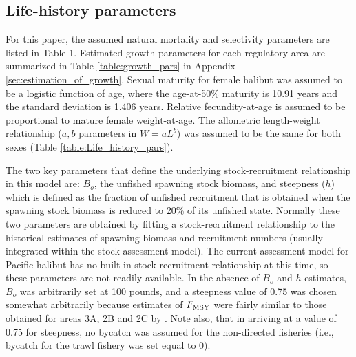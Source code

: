 \subsection*{Life-history parameters}%
\label{sub:life_history_parameters_and_price_information}
For this paper, the assumed natural mortality  and selectivity parameters are listed in Table 1.  Estimated growth parameters for each regulatory area are summarized in Table \ref{table:growth_pars} in Appendix \ref{sec:estimation_of_growth}.  Sexual maturity for female halibut was assumed to be a logistic function of age, where the age-at-50\% maturity is 10.91 years and the standard deviation is 1.406 years.  Relative fecundity-at-age is assumed to be proportional to mature female weight-at-age.  The allometric length-weight relationship ($a,b$ parameters in $W = a L ^b$) was assumed to be the same for both sexes (Table \ref{table:Life_history_pars}).

The two key parameters that define the underlying stock-recruitment relationship in this model are: $B_o$, the unfished spawning stock biomass, and steepness ($h$) which is defined as the fraction of unfished recruitment that is obtained when the spawning stock biomass is reduced to 20\% of its unfished state.  Normally these two parameters are obtained by fitting a stock-recruitment relationship to the historical estimates of spawning biomass and recruitment numbers (usually integrated within the stock assessment model).  The current assessment model for Pacific halibut has no built in stock recruitment relationship at this time, so these parameters are not readily available.  In the absence of $B_o$ and $h$ estimates, $B_o$ was arbitrarily set at 100 pounds,  and a steepness value of 0.75 was chosen somewhat arbitrarily because estimates of $F_{\rm{MSY}}$ were fairly similar to those obtained for areas 3A, 2B and 2C by \cite{clark2006assessment}.  Note also, that in arriving at a value of 0.75 for steepness, no  bycatch was assumed for the non-directed fisheries (i.e., bycatch for the trawl fishery was set equal to 0).



